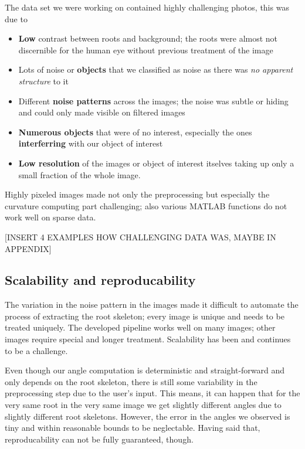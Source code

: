 The data set we were working on contained highly challenging photos, this was due to
\begin{itemize}
	\item \textbf{Low} contrast between roots and background; the roots were almost not discernible for the human eye without previous treatment of the image
	\item Lots of noise or \textbf{objects} that we classified as noise as there was \textit{no apparent structure} to it
	\item Different \textbf{noise patterns} across the images; the noise was subtle or hiding and could only made visible on filtered images
	\item \textbf{Numerous objects} that were of no interest, especially the ones \textbf{interferring} with our object of interest
	\item \textbf{Low resolution} of the images or object of interest itselves taking up only a small fraction of the whole image. 
\end{itemize}
Highly pixeled images made not only the preprocessing but especially the curvature computing part challenging; also various MATLAB functions do not work well on sparse data.

[INSERT 4 EXAMPLES HOW CHALLENGING DATA WAS, MAYBE IN APPENDIX]



\subsection{Scalability and reproducability}

The variation in the noise pattern in the images made it difficult to automate the process of extracting the root skeleton; every image is unique and needs to be treated uniquely. The developed pipeline works well on many images; other images require special and longer treatment. Scalability has been and continues to be a challenge.

Even though our angle computation is deterministic and straight-forward and only depends on the root skeleton, there is still some variability in the preprocessing step due to the user's input. This means, it can happen that for the very same root in the very same image we get slightly different angles due to slightly different root skeletons. %
However, the error in the angles we observed is tiny and within reasonable bounds to be neglectable. Having said that, reproducability can not be fully guaranteed, though. 


